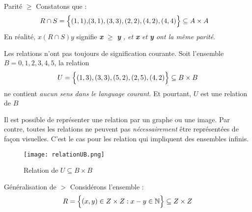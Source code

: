 \documentclass[16pt]{report}
\begin{document}
\begin{multicols*}{2}
            \begin{EExample}{Parité $\geq$}{}
                Constatons que : 
                \begin{align*}
                    R \cap S =  \Bigl\{(1,1),&(3,1),  
                                             (3,3), (2,2),  
                                             (4,2), (4,4) \Bigr\} 
                 \subseteq A \times A
                \end{align*}
                En réalité, $x(R\cap S)y$ signifie \textbf{\textit{x}} $\geq$ \textbf{\textit{y}} 
                \textit{, et \textbf{x} et \textbf{y} ont la même parité}.   
            \end{EExample}
        


            \begin{note}{}{}
                 Les relations n'ont pas toujours de signification courante. 
                 Soit l'ensemble $B = {0, 1, 2, 3, 4, 5}$, la relation  
                \begin{align*}
                            U = \Bigl\{ (1,3), (3,3), (5,2), (2,5), (4,2) \Bigr\} 
                            \subseteq B \times B 
                \end{align*}
                ne contient \textit{aucun sens dans le language courant}. Et pourtant, 
                $U$ est une relation de $B$
            \end{note}

            Il est possible de représenter une relation par un graphe ou une image.
            Par contre, toutes les relations ne peuvent pas \textit{nécessairement} être représentées 
            de façon visuelles. C'est le cas pour les relation qui impliquent des ensembles infinis. 


            \begin{figure}[H]
                \begin{center}
                    \texttt{[image: relationUB.png]}
                \end{center}
                \caption{Relation de $U \subseteq B \times B$}
            \end{figure}


            \begin{EExample}{Généralisation de $>$}{}
                Considérons l'ensemble : 
                                \[ R = \Bigl\{ (x,y) \in Z \times Z : x - y \in \mathbb{N} \Bigr\}  
                                 \subseteq  Z \times Z \]


\end{EExample}
\end{multicols*}
\end{document}
